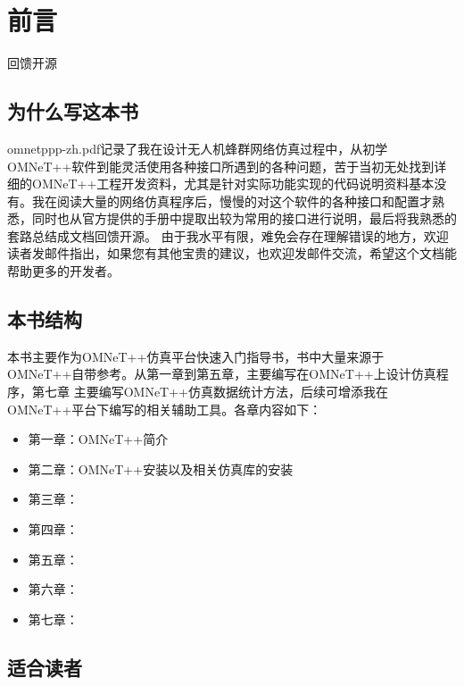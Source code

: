 \chapter{前言}
\label{前言}

回馈开源

\section{为什么写这本书}
\label{为什么写这本书}

omnetppp-zh.pdf记录了我在设计无人机蜂群网络仿真过程中，从初学OMNeT++软件到能灵活使用各种接口所遇到的各种问题，苦于当初无处找到详细的OMNeT++工程开发资料，尤其是针对实际功能实现的代码说明资料基本没有。我在阅读大量的网络仿真程序后，慢慢的对这个软件的各种接口和配置才熟悉，同时也从官方提供的手册中提取出较为常用的接口进行说明，最后将我熟悉的套路总结成文档回馈开源。
由于我水平有限，难免会存在理解错误的地方，欢迎读者发邮件指出，如果您有其他宝贵的建议，也欢迎发邮件交流，希望这个文档能帮助更多的开发者。

\section{本书结构}
\label{本书结构}

本书主要作为OMNeT++仿真平台快速入门指导书，书中大量来源于OMNeT++自带参考。从第一章到第五章，主要编写在OMNeT++上设计仿真程序，第七章
主要编写OMNeT++仿真数据统计方法，后续可增添我在OMNeT++平台下编写的相关辅助工具。各章内容如下：

\begin{itemize}
\item 第一章：OMNeT++简介

\item 第二章：OMNeT++安装以及相关仿真库的安装

\item 第三章：

\item 第四章：

\item 第五章：

\item 第六章：

\item 第七章：

\end{itemize}

\section{适合读者}
\label{适合读者}

